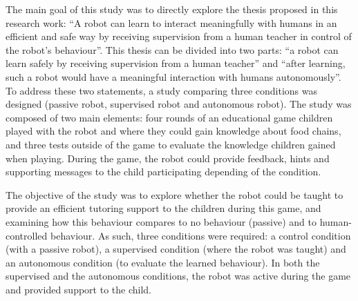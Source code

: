 The main goal of this study was to directly explore the thesis proposed in this research work: ``A robot can learn to interact meaningfully with humans in an efficient and safe way by receiving supervision from a human teacher in control of the robot's behaviour''. This thesis can be divided into two parts: ``a robot can learn safely by receiving supervision from a human teacher'' and ``after learning, such a robot would have a meaningful interaction with humans autonomously''. To address these two statements, a study comparing three conditions was designed (passive robot, supervised robot and autonomous robot). The study was composed of two main elements: four rounds of an educational game children played with the robot and where they could gain knowledge about food chains, and three tests outside of the game to evaluate the knowledge children gained when playing. During the game, the robot could provide feedback, hints and supporting messages to the child participating depending of the condition. 

The objective of the study was to explore whether the robot could be taught to provide an efficient tutoring support to the children during this game, 
and examining how this behaviour compares to no behaviour (passive) and to human-controlled behaviour. As such, three conditions were required: a control condition (with a passive robot), a supervised condition (where the robot was taught) and an autonomous condition (to evaluate the learned behaviour). In both the supervised and the autonomous conditions, the robot was active during the game and provided support to the child.

